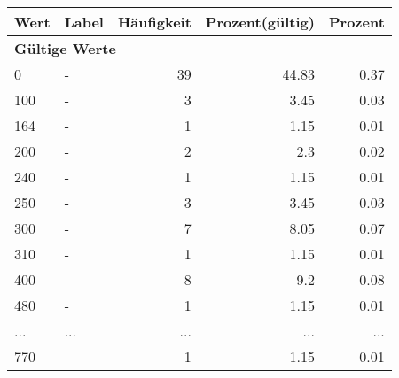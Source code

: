      \begin{longtable}{lXrrr}
     \toprule
     \textbf{Wert} & \textbf{Label} & \textbf{Häufigkeit} & \textbf{Prozent(gültig)} & \textbf{Prozent} \\
     \endhead
     \midrule
     \multicolumn{5}{l}{\textbf{Gültige Werte}}\\
        0 & \multicolumn{1}{X}{-} & %
          \num{39} &
          \num[round-mode=places,round-precision=2]{44,83} &
          \num[round-mode=places,round-precision=2]{0,37} \\
        100 & \multicolumn{1}{X}{-} & %
          \num{3} &
          \num[round-mode=places,round-precision=2]{3,45} &
          \num[round-mode=places,round-precision=2]{0,03} \\
        164 & \multicolumn{1}{X}{-} & %
          \num{1} &
          \num[round-mode=places,round-precision=2]{1,15} &
          \num[round-mode=places,round-precision=2]{0,01} \\
        200 & \multicolumn{1}{X}{-} & %
          \num{2} &
          \num[round-mode=places,round-precision=2]{2,3} &
          \num[round-mode=places,round-precision=2]{0,02} \\
        240 & \multicolumn{1}{X}{-} & %
          \num{1} &
          \num[round-mode=places,round-precision=2]{1,15} &
          \num[round-mode=places,round-precision=2]{0,01} \\
        250 & \multicolumn{1}{X}{-} & %
          \num{3} &
          \num[round-mode=places,round-precision=2]{3,45} &
          \num[round-mode=places,round-precision=2]{0,03} \\
        300 & \multicolumn{1}{X}{-} & %
          \num{7} &
          \num[round-mode=places,round-precision=2]{8,05} &
          \num[round-mode=places,round-precision=2]{0,07} \\
        310 & \multicolumn{1}{X}{-} & %
          \num{1} &
          \num[round-mode=places,round-precision=2]{1,15} &
          \num[round-mode=places,round-precision=2]{0,01} \\
        400 & \multicolumn{1}{X}{-} & %
          \num{8} &
          \num[round-mode=places,round-precision=2]{9,2} &
          \num[round-mode=places,round-precision=2]{0,08} \\
        480 & \multicolumn{1}{X}{-} & %
          \num{1} &
          \num[round-mode=places,round-precision=2]{1,15} &
          \num[round-mode=places,round-precision=2]{0,01} \\
       ... & ... & ... & ... & ... \\
        770 & \multicolumn{1}{X}{-} & %
          \num{1} &
          \num[round-mode=places,round-precision=2]{1,15} &
          \num[round-mode=places,round-precision=2]{0,01} \\


\end{longtable}
